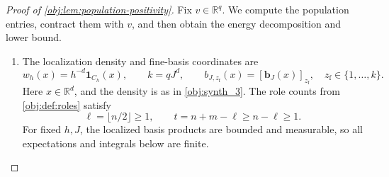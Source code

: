 \documentclass[11pt]{article}
\begin{document}
\begin{proof}[Proof of \cref{obj:lem:population-positivity}]
Fix \(v\in\mathbb R^q\). We compute the population entries, contract them with \(v\), and then obtain the energy decomposition and lower bound.

\begin{enumerate}
\item The localization density and fine-basis coordinates are
\[
w_h(x)=h^{-d}\mathbf 1_{C_h}(x),
\qquad
k=qJ^d,
\qquad
b_{J,z_{\mathrm f}}(x)=[\mathbf b_J(x)]_{z_{\mathrm f}},
\quad z_{\mathrm f}\in\{1,\ldots,k\}.
\]
Here \(x\in\mathbb R^d\), and the density is as in
\cref{obj:synth_3}. The role counts from \cref{obj:def:roles} satisfy
\[
\ell=\lfloor n/2\rfloor\ge1,
\qquad
t=n+m-\ell\ge n-\ell\ge1.
\]
For fixed \(h,J\), the localized basis products are bounded and measurable, so all expectations and integrals below are finite.


\end{enumerate}
\end{proof}
\end{document}
